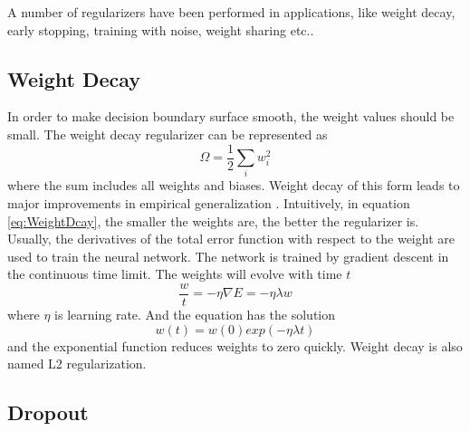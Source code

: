 A number of regularizers have been performed in applications, like weight decay, early stopping, training with noise, weight sharing etc..

\subsection{Weight Decay}

In order to make decision boundary surface smooth, the weight values should be small. The weight decay regularizer can be represented as
\begin{equation}\label{eq:WeightDcay}
\Omega = \frac{1}{2} \sum_i w_{i}^2
\end{equation}
where the sum includes all weights and biases. Weight decay of this form leads to major improvements in empirical generalization \citep{hinton1987learning}. Intuitively, in equation \ref{eq:WeightDcay}, the smaller the weights are, the better the regularizer is. Usually, the derivatives of the total error function with respect to the weight are used to train the neural network. The network is trained by gradient descent in the continuous time limit. The weights will evolve with time $t$
\begin{equation}\label{eq:WeightDecayTime}
\frac{w}{t} = -\eta\nabla E = -\eta\lambda w
\end{equation}
where $\eta$ is learning rate. And the equation has the solution
\begin{equation}\label{eq:WeightDecaySolution}
w(t) = w(0)exp(-\eta\lambda t)
\end{equation}
and the exponential function reduces weights to zero quickly. Weight decay is also named L2 regularization.

\subsection{Dropout}

